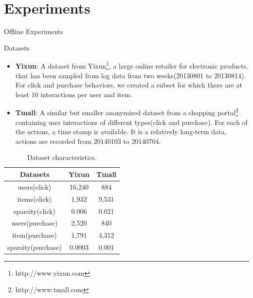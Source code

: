 
\chapter{Experiments}
\label{chp:exp}

\hspace{0.1in}
\begin{section}{Offline Experiments}\label{sec:offline}
  \begin{subsection}{Datasets}


\begin{itemize}

\item \textbf{Yixun}: A dataset from Yixun\footnote{http://www.yixun.com}, a large online retailer for electronic products, that has been sampled from log data from two weeks(20130801 to 20130814). For click and purchase behaviors, we created a subset for which there are at least 10 interactions per user and item. 
\item \textbf{Tmall}: A similar but smaller anonymized dataset from a shopping portal\footnote{http://www.tmall.com} containing user interactions of different types(click and purchase). For each of the actions, a time stamp is available. It is a relatively long-term data, actions are recorded from 20140103 to 20140704. 
\end{itemize}

\begin{table}
\begin{center}
  \begin{tabular}{c c c}
    \hline
    Datasets & Yixun & Tmall\\
    \hline
    users(click) & 16,240 & 884\\
    items(click) & 1,932 & 9,531\\
    sparsity(click) & 0.006 & 0.021\\
    \hline
    users(purchase) & 2,520& 840\\
    item(purchase) & 1,791& 4,312\\
    sparsity(purchase) & 0.0003 & 0.001\\
\hline
  \end{tabular}
\end{center}
\caption{Dataset characteristics.}
\label{dataset}


\end{table}
\end{subsection}




\end{section}
